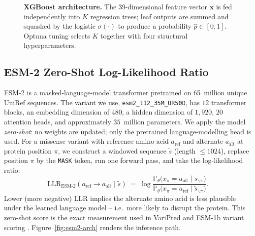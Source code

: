 \documentclass[11pt,a4paper,oneside]{report}
\begin{document}
\begin{figure}[htbp]
{}
\caption[XGBoost architecture]{\textbf{XGBoost
architecture.} The 39-dimensional feature vector
$\mathbf{x}$ is fed independently into $K$ regression
trees; leaf outputs are summed and squashed by the
logistic $\sigma(\cdot)$ to produce a probability
$\hat p \in [0, 1]$. Optuna tuning selects $K$ together with
four structural hyperparameters.}
\label{fig:xgb-arch}
\end{figure}

\subsection{ESM-2 Zero-Shot Log-Likelihood Ratio}
\label{sec:arch-esm2}

ESM-2 \citep{lin2023esm2} is a masked-language-model
transformer \citep{vaswani2017attention} pretrained on
65~million unique UniRef sequences. The variant we use,
\texttt{esm2\_t12\_35M\_UR50D}, has
$12$ transformer blocks, an embedding dimension of $480$, a
hidden dimension of $1{,}920$, $20$ attention heads, and
approximately $35$~million parameters. We apply the model
\emph{zero-shot}: no weights are updated; only the
pretrained language-modelling head is used. For a missense
variant with reference amino acid $a_{\text{ref}}$ and
alternate $a_{\text{alt}}$ at protein position $\pi$, we
construct a windowed sequence $\tilde{s}$ (length
$\leq 1024$), replace position $\pi$ by the \texttt{MASK}
token, run one forward pass, and take the log-likelihood
ratio:
\begin{equation}
  \mathrm{LLR}_{\text{ESM-2}}(a_{\text{ref}} \to a_{\text{alt}} \mid \tilde{s})
  \;=\;
  \log \frac{\mathbb{P}_{\theta}\!\big(x_\pi = a_{\text{alt}} \mid \tilde{s}_{\backslash \pi}\big)}
           {\mathbb{P}_{\theta}\!\big(x_\pi = a_{\text{ref}} \mid \tilde{s}_{\backslash \pi}\big)}.
  \label{eq:esm2-llr}
\end{equation}
Lower (more negative) LLR implies the alternate amino acid
is less plausible under the learned language model --
i.e.\ more likely to disrupt the protein. This zero-shot
score is the exact measurement used in VariPred
\citep{lin2024varipred} and ESM-1b variant scoring
\citep{brandes2023esm1b}. Figure~\ref{fig:esm2-arch}
renders the inference path.
\end{document}
